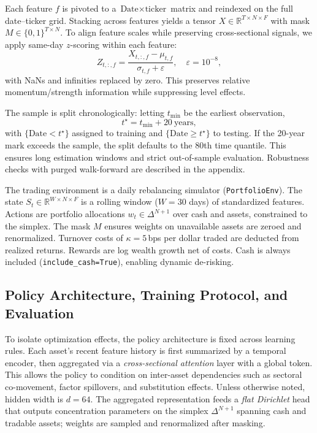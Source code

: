 \documentclass[10pt,leqno]{amsart}
\begin{document}
Each feature $f$ is pivoted to a $\text{Date}\times\text{ticker}$ matrix and reindexed on the full date–ticker grid. Stacking across features yields a tensor $X\in\mathbb{R}^{T\times N\times F}$ with mask $M\in\{0,1\}^{T\times N}$. To align feature scales while preserving cross-sectional signals, we apply same-day $z$-scoring within each feature:
\[
Z_{t,:,f} = \frac{X_{t,:,f}-\mu_{t,f}}{\sigma_{t,f}+\varepsilon}, \quad \varepsilon=10^{-8},
\]
with NaNs and infinities replaced by zero. This preserves relative momentum/strength information while suppressing level effects.

The sample is split chronologically: letting $t_{\min}$ be the earliest observation,
\[
t^\star = t_{\min} + 20~\text{years},
\]
with $\{\text{Date}<t^\star\}$ assigned to training and $\{\text{Date}\ge t^\star\}$ to testing. If the 20-year mark exceeds the sample, the split defaults to the 80th time quantile. This ensures long estimation windows and strict out-of-sample evaluation. Robustness checks with purged walk-forward are described in the appendix.

The trading environment is a daily rebalancing simulator (\texttt{PortfolioEnv}). The state $S_t\in\mathbb{R}^{W\times N\times F}$ is a rolling window ($W{=}30$ days) of standardized features. Actions are portfolio allocations $w_t\in\Delta^{N+1}$ over cash and assets, constrained to the simplex. The mask $M$ ensures weights on unavailable assets are zeroed and renormalized. Turnover costs of $\kappa=5$\,bps per dollar traded are deducted from realized returns. Rewards are log wealth growth net of costs. Cash is always included (\texttt{include\_cash=True}), enabling dynamic de-risking.

\subsection{Policy Architecture, Training Protocol, and Evaluation}
To isolate optimization effects, the policy architecture is fixed across learning rules. Each asset’s recent feature history is first summarized by a temporal encoder, then aggregated via a \emph{cross-sectional attention} layer with a global token. This allows the policy to condition on inter-asset dependencies such as sectoral co-movement, factor spillovers, and substitution effects. Unless otherwise noted, hidden width is $d=64$. The aggregated representation feeds a \emph{flat Dirichlet} head that outputs concentration parameters on the simplex $\Delta^{N+1}$ spanning cash and tradable assets; weights are sampled and renormalized after masking.
\end{document}
